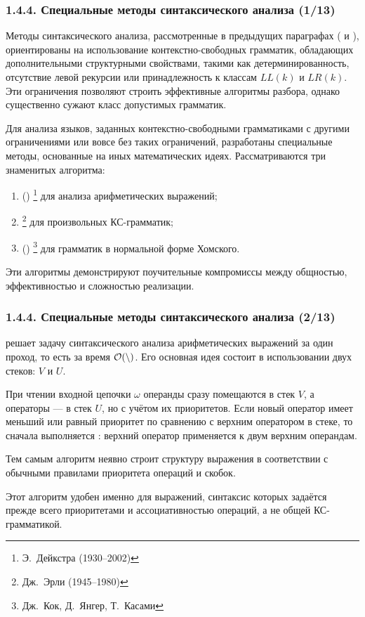 \begin{frame}
\frametitle{1.4.4. Специальные методы синтаксического анализа (1/13)}

Методы синтаксического анализа, рассмотренные в предыдущих параграфах ( и ), ориентированы на использование контекстно-свободных грамматик, обладающих дополнительными структурными свойствами, такими как детерминированность, отсутствие левой рекурсии или принадлежность к классам $LL(k)$ и $LR(k)$. Эти ограничения позволяют строить эффективные алгоритмы разбора, однако существенно сужают класс допустимых грамматик.

Для анализа языков, заданных контекстно-свободными грамматиками с другими ограничениями или вовсе без таких ограничений, разработаны специальные методы, основанные на иных математических идеях. Рассматриваются три знаменитых алгоритма:
\begin{enumerate}
    \item {}
    ()%
    \footnote{Э.~Дейкстра (1930--2002)}
    для анализа арифметических выражений;
    \item {}%
    \footnote{Дж.~Эрли (1945--1980)}
    для произвольных КС-грамматик;
    \item {}
    ()%
    \footnote{Дж.~Кок, Д.~Янгер, Т.~Касами}
    для грамматик в нормальной форме Хомского.
\end{enumerate}

Эти алгоритмы демонстрируют поучительные компромиссы между общностью, эффективностью и сложностью реализации.
\end{frame}


\begin{frame}
\frametitle{1.4.4. Специальные методы синтаксического анализа (2/13)}

 решает задачу синтаксического анализа
арифметических выражений за один проход, то есть за время $\cal O(n)$.
Его основная идея состоит в использовании двух стеков:
 $V$ и
 $U$.

При чтении входной цепочки $\omega$ операнды сразу помещаются в стек $V$,
а операторы --- в стек $U$, но с учётом их приоритетов. Если новый оператор
имеет меньший или равный приоритет по сравнению с верхним оператором в стеке,
то сначала выполняется : верхний оператор применяется
к двум верхним операндам.

Тем самым алгоритм неявно строит структуру выражения в соответствии с обычными
правилами приоритета операций и скобок.

\begin{remark}
Этот алгоритм удобен именно для выражений, синтаксис которых задаётся прежде всего
приоритетами и ассоциативностью операций, а не общей КС-грамматикой.
\end{remark}
\end{frame}

